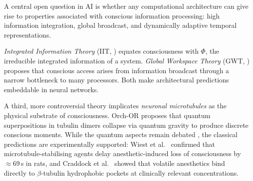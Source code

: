 \documentclass[11pt]{article}
\theoremstyle{definition}
\begin{document}
A central open question in AI is whether any computational architecture can give rise to properties associated with conscious information processing: high information integration, global broadcast, and dynamically adaptive temporal representations.

\emph{Integrated Information Theory} (IIT, \citealt{tononi2004information}) equates consciousness with $\Phi$, the irreducible integrated information of a system. \emph{Global Workspace Theory} (GWT, \citealt{baars1988cognitive,dehaene2011experimental}) proposes that conscious access arises from information broadcast through a narrow bottleneck to many processors. Both make architectural predictions embeddable in neural networks.

A third, more controversial theory implicates \emph{neuronal microtubules} as the physical substrate of consciousness. Orch-OR \citep{penrose1994shadows,hameroff2014consciousness} proposes that quantum superpositions in tubulin dimers collapse via quantum gravity to produce discrete conscious moments. While the quantum aspects remain debated \citep{tegmark2000importance}, the classical predictions are experimentally supported: Wiest et al.\ \citep{wiest2025quantum} confirmed that microtubule-stabilising agents delay anesthetic-induced loss of consciousness by $\approx$69\,s in rats, and Craddock et al.\ \citep{craddock2017anesthetic} showed that volatile anesthetics bind directly to $\beta$-tubulin hydrophobic pockets at clinically relevant concentrations.
\end{document}
